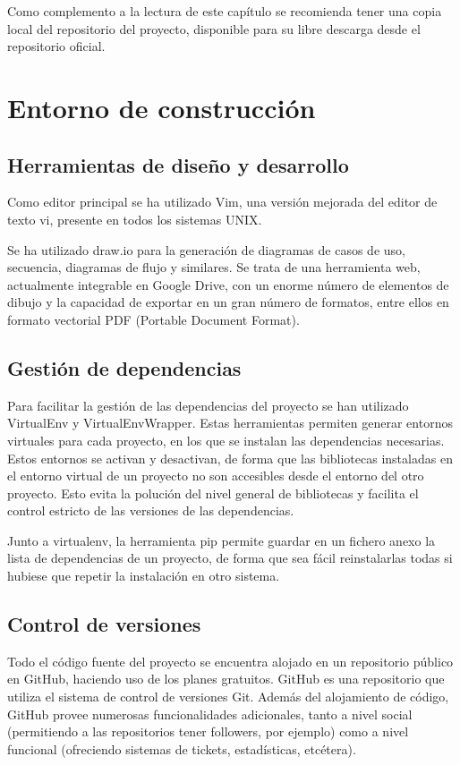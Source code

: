 Como complemento a la lectura de este capítulo se recomienda tener una copia
local del repositorio del proyecto, disponible para su libre descarga desde
el repositorio oficial.

\section{Entorno de construcción}

\subsection{Herramientas de diseño y desarrollo}

Como editor principal se ha utilizado Vim, una versión mejorada del editor de
texto vi, presente en todos los sistemas UNIX.

Se ha utilizado draw.io para la generación de diagramas de casos de uso,
secuencia, diagramas de flujo y similares. Se trata de una herramienta web, 
actualmente integrable en Google Drive, con un enorme número de elementos de
dibujo y la capacidad de exportar en un gran número de formatos, entre ellos en
formato vectorial PDF (Portable Document Format).

\subsection{Gestión de dependencias}

Para facilitar la gestión de las dependencias del proyecto se han utilizado VirtualEnv
y VirtualEnvWrapper. Estas herramientas permiten generar
entornos virtuales para cada proyecto, en los que se instalan las dependencias necesarias.
Estos entornos se activan y desactivan, de forma que las bibliotecas instaladas en
el entorno virtual de un proyecto no son accesibles desde el entorno del
otro proyecto. Esto evita la polución del nivel general de bibliotecas y facilita el
control estricto de las versiones de las dependencias.

Junto a virtualenv, la herramienta pip permite guardar en un fichero anexo
la lista de dependencias de un proyecto, de forma que sea fácil reinstalarlas todas
si hubiese que repetir la instalación en otro sistema.

\subsection{Control de versiones}

Todo el código fuente del proyecto se encuentra alojado en un repositorio público
en GitHub, haciendo uso de los planes gratuitos. GitHub es una repositorio que
utiliza el sistema de control de versiones Git. Además del alojamiento de
código, GitHub provee numerosas funcionalidades adicionales, tanto a nivel
social (permitiendo a las repositorios tener followers, por ejemplo) como a nivel funcional
(ofreciendo sistemas de tickets, estadísticas, etcétera).

